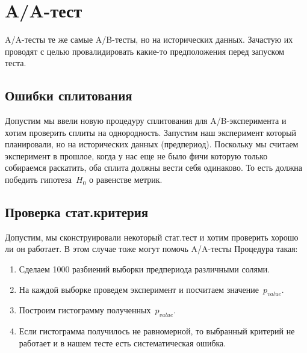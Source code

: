 \documentclass[../handbook.tex]{subfiles}
\begin{document}
\section{A\slash A-тест}
A\slash A-тесты те же самые A\slash B-тесты, но на исторических данных. Зачастую их проводят с целью провалидировать какие-то предположения перед запуском теста.

\subsection{Ошибки сплитования}

Допустим мы ввели новую процедуру сплитования для A/B-эксперимента и хотим проверить сплиты на однородность. Запустим наш эксперимент который планировали, но на исторических данных (предпериод). Поскольку мы считаем эксперимент в прошлое, когда у нас еще не было фичи которую только собираемся раскатить, оба сплита должны вести себя одинаково. То есть должна победить гипотеза~$H_0$ о равенстве метрик.

\subsection{Проверка стат.критерия}
Допустим, мы сконструировали некоторый стат.тест и хотим проверить хорошо ли он работает. В этом случае тоже могут помочь A\slash A-тесты Процедура такая:

\begin{enumerate}
    \item Сделаем 1000 разбиений выборки предпериода различными солями.
    \item На каждой выборке проведем эксперимент и посчитаем значение~$p_{value}$.
    \item Построим гистограмму полученных~$p_{value}$.
    \item Если гистограмма получилось не равномерной, то выбранный критерий не работает и в нашем тесте есть систематическая ошибка. 
\end{enumerate}
\end{document}
